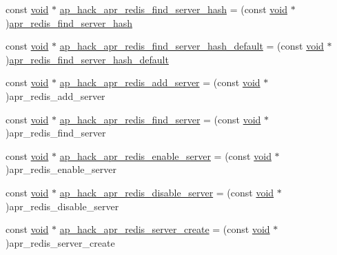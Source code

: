 \begin{DoxyCompactItemize}
\item 
const \hyperlink{group__MOD__ISAPI_gacd6cdbf73df3d9eed42fa493d9b621a6}{void} $\ast$ \hyperlink{srclib_2apr-util_2exports_8c_a9a60dfb642345c2660ab9fef87c9c3ef}{ap\+\_\+hack\+\_\+apr\+\_\+redis\+\_\+find\+\_\+server\+\_\+hash} = (const \hyperlink{group__MOD__ISAPI_gacd6cdbf73df3d9eed42fa493d9b621a6}{void} $\ast$)\hyperlink{apr__redis_8c_a31a1bf0748f91cb73d35c3c8b3385be1}{apr\+\_\+redis\+\_\+find\+\_\+server\+\_\+hash}
\item 
const \hyperlink{group__MOD__ISAPI_gacd6cdbf73df3d9eed42fa493d9b621a6}{void} $\ast$ \hyperlink{srclib_2apr-util_2exports_8c_a9591d7f2fbbcdf6bf9e65138675d4dd1}{ap\+\_\+hack\+\_\+apr\+\_\+redis\+\_\+find\+\_\+server\+\_\+hash\+\_\+default} = (const \hyperlink{group__MOD__ISAPI_gacd6cdbf73df3d9eed42fa493d9b621a6}{void} $\ast$)\hyperlink{apr__redis_8c_a94f4c31c7b88d36bf6765209f668e659}{apr\+\_\+redis\+\_\+find\+\_\+server\+\_\+hash\+\_\+default}
\item 
const \hyperlink{group__MOD__ISAPI_gacd6cdbf73df3d9eed42fa493d9b621a6}{void} $\ast$ \hyperlink{srclib_2apr-util_2exports_8c_a3d4445783a14b990ca46e172b1b01273}{ap\+\_\+hack\+\_\+apr\+\_\+redis\+\_\+add\+\_\+server} = (const \hyperlink{group__MOD__ISAPI_gacd6cdbf73df3d9eed42fa493d9b621a6}{void} $\ast$)apr\+\_\+redis\+\_\+add\+\_\+server
\item 
const \hyperlink{group__MOD__ISAPI_gacd6cdbf73df3d9eed42fa493d9b621a6}{void} $\ast$ \hyperlink{srclib_2apr-util_2exports_8c_ae3774cfb154756592c6a3ecefa5519e0}{ap\+\_\+hack\+\_\+apr\+\_\+redis\+\_\+find\+\_\+server} = (const \hyperlink{group__MOD__ISAPI_gacd6cdbf73df3d9eed42fa493d9b621a6}{void} $\ast$)apr\+\_\+redis\+\_\+find\+\_\+server
\item 
const \hyperlink{group__MOD__ISAPI_gacd6cdbf73df3d9eed42fa493d9b621a6}{void} $\ast$ \hyperlink{srclib_2apr-util_2exports_8c_a749646109592b14811199ebf964c56b4}{ap\+\_\+hack\+\_\+apr\+\_\+redis\+\_\+enable\+\_\+server} = (const \hyperlink{group__MOD__ISAPI_gacd6cdbf73df3d9eed42fa493d9b621a6}{void} $\ast$)apr\+\_\+redis\+\_\+enable\+\_\+server
\item 
const \hyperlink{group__MOD__ISAPI_gacd6cdbf73df3d9eed42fa493d9b621a6}{void} $\ast$ \hyperlink{srclib_2apr-util_2exports_8c_a93944416ac14e7b73a41dfebdb2df270}{ap\+\_\+hack\+\_\+apr\+\_\+redis\+\_\+disable\+\_\+server} = (const \hyperlink{group__MOD__ISAPI_gacd6cdbf73df3d9eed42fa493d9b621a6}{void} $\ast$)apr\+\_\+redis\+\_\+disable\+\_\+server
\item 
const \hyperlink{group__MOD__ISAPI_gacd6cdbf73df3d9eed42fa493d9b621a6}{void} $\ast$ \hyperlink{srclib_2apr-util_2exports_8c_a29af8695162010f4dc02a5c7cc9554cc}{ap\+\_\+hack\+\_\+apr\+\_\+redis\+\_\+server\+\_\+create} = (const \hyperlink{group__MOD__ISAPI_gacd6cdbf73df3d9eed42fa493d9b621a6}{void} $\ast$)apr\+\_\+redis\+\_\+server\+\_\+create

\end{DoxyCompactItemize}
